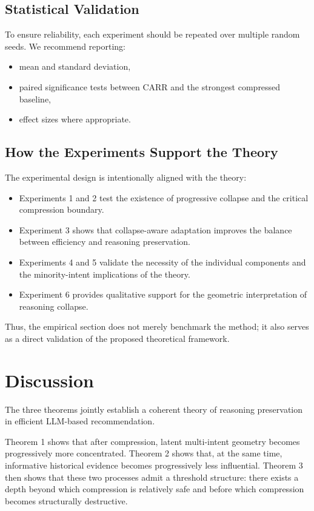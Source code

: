 \documentclass[11pt]{article}
\begin{document}
\subsection{Statistical Validation}

To ensure reliability, each experiment should be repeated over multiple random seeds. We recommend reporting:
\begin{itemize}
    \item mean and standard deviation,
    \item paired significance tests between CARR and the strongest compressed baseline,
    \item effect sizes where appropriate.
\end{itemize}

\subsection{How the Experiments Support the Theory}

The experimental design is intentionally aligned with the theory:
\begin{itemize}
    \item Experiments 1 and 2 test the existence of progressive collapse and the critical compression boundary.
    \item Experiment 3 shows that collapse-aware adaptation improves the balance between efficiency and reasoning preservation.
    \item Experiments 4 and 5 validate the necessity of the individual components and the minority-intent implications of the theory.
    \item Experiment 6 provides qualitative support for the geometric interpretation of reasoning collapse.
\end{itemize}

Thus, the empirical section does not merely benchmark the method; it also serves as a direct validation of the proposed theoretical framework.

\section{Discussion}

The three theorems jointly establish a coherent theory of reasoning preservation in efficient LLM-based recommendation.

Theorem 1 shows that after compression, latent multi-intent geometry becomes progressively more concentrated. Theorem 2 shows that, at the same time, informative historical evidence becomes progressively less influential. Theorem 3 then shows that these two processes admit a threshold structure: there exists a depth beyond which compression is relatively safe and before which compression becomes structurally destructive.
\end{document}
